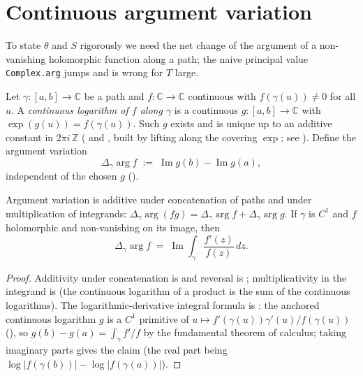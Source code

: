 \section{Continuous argument variation}
\label{sec:nf_argvar}

To state $\theta$ and $S$ rigorously we need the net change of the argument of a
non-vanishing holomorphic function along a path; the naive principal value
\texttt{Complex.arg} jumps and is wrong for $T$ large.

\begin{definition}
\label{def:nf_argvar}
\leanok
{}
Let $\gamma:[a,b]\to\mathbb{C}$ be a path and $f:\mathbb{C}\to\mathbb{C}$ continuous
with $f(\gamma(u))\neq0$ for all $u$. A \emph{continuous logarithm of $f$ along
$\gamma$} is a continuous $g:[a,b]\to\mathbb{C}$ with $\exp(g(u))=f(\gamma(u))$.
Such $g$ exists and is unique up to an additive constant in $2\pi i\,\mathbb{Z}$
( and , built by lifting along the covering $\exp$;
see ). Define the argument variation
\[
  \Delta_\gamma\arg f \;:=\; \operatorname{Im} g(b) - \operatorname{Im} g(a),
\]
independent of the chosen $g$ ().
\end{definition}

\begin{lemma}
\label{lem:nf_argvar_props}
\leanok
{}
Argument variation is additive under concatenation of paths and under
multiplication of integrands:
$\Delta_\gamma\arg(fg) = \Delta_\gamma\arg f + \Delta_\gamma\arg g$. If $\gamma$ is
$C^1$ and $f$ holomorphic and non-vanishing on its image, then
\[
  \Delta_\gamma\arg f \;=\; \operatorname{Im}\!\int_\gamma \frac{f'(z)}{f(z)}\,dz .
\]
\end{lemma}

\begin{proof}
\leanok
{}
Additivity under concatenation is  and reversal is
; multiplicativity in the integrand is 
(the continuous logarithm of a product is the sum of the continuous logarithms).
The logarithmic-derivative integral formula is : the anchored
continuous logarithm $g$ is a $C^1$ primitive of
$u\mapsto f'(\gamma(u))\gamma'(u)/f(\gamma(u))$ (), so
$g(b)-g(a)=\int_\gamma f'/f$ by the fundamental theorem of calculus; taking
imaginary parts gives the claim (the real part being
$\log|f(\gamma(b))|-\log|f(\gamma(a))|$).
\end{proof}

